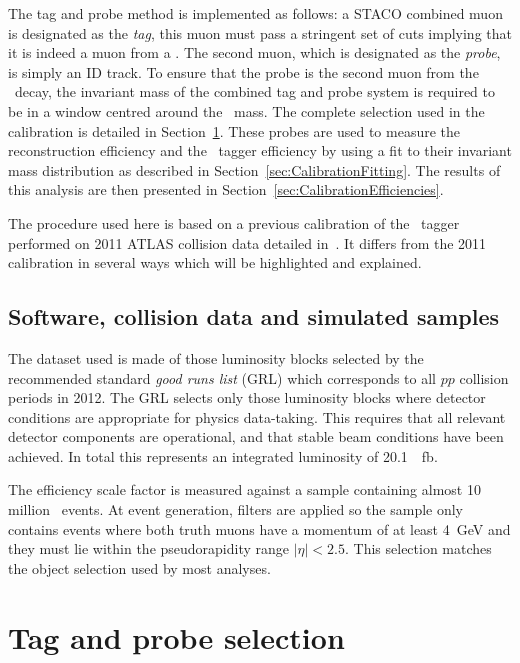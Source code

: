 The tag and probe method is implemented as follows: a STACO combined muon is designated as the \emph{tag}, this muon must pass a stringent set of cuts implying that it is indeed a muon from a \jpsi. The second muon, which is designated as the \emph{probe}, is simply an ID track. To ensure that the probe is the second muon from the \jpsi\ decay, the invariant mass of the combined tag and probe system is required to be in a window centred around the \jpsi\ mass. The complete selection used in the calibration is detailed in Section~\ref{sec:CalibrationSelection}. These probes are used to measure the reconstruction efficiency and the \xsm\ tagger efficiency by using a fit to their invariant mass distribution as described in Section~\ref{sec:CalibrationFitting}. The results of this analysis are then presented in Section~\ref{sec:CalibrationEfficiencies}.

The procedure used here is based on a previous calibration of the \xsm\ tagger performed on 2011 ATLAS collision data detailed in~\cite{Calibration:MattThesis}. It differs from the 2011 calibration in several ways which will be highlighted and explained.

\subsection*{Software, collision data and simulated samples}

The dataset used is made of those luminosity blocks selected by the recommended standard \emph{good runs list} (GRL) which corresponds to all $pp$ collision periods in 2012. The GRL selects only those luminosity blocks where detector conditions are appropriate for physics data-taking. This requires that all relevant detector components are operational, and that stable beam conditions have been achieved. In total this represents an integrated luminosity of \SI{20.1}{\per\femto\barn}. 

The efficiency scale factor is measured against a sample containing almost 10 million \JMu\ events. At event generation, filters are applied so the sample only contains events where both truth muons have a momentum of at least \SI{4}{\GeV} and they must lie within the pseudorapidity range $|\eta|<2.5$. This selection matches the object selection used by most analyses. 

\section{Tag and probe selection}\label{sec:CalibrationSelection}

